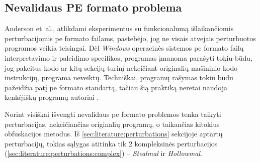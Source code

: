 \subsection{Nevalidaus PE formato problema}\label{sec:literature:pe_invalid}

Anderson et~al., atlikdami eksperimentus su funkcionalumą išlaikančiomis perturbacijomis \acs{pe} formato failams, pastebėjo, jog ne visais atvejais perturbuotos programos veikia teisingai. Dėl \textit{Windows} operacinės sistemos \acs{pe} formato failų interpretavimo ir paleidimo specifikos, programas įmanoma parašyti tokiu būdu, jog pakeitus kodo ar kitų sekcijų turinį nekeičiant originalių mašininio kodo instrukcijų, programa neveiktų. Techniškai, programų rašymas tokiu būdu pažeidžia patį \acs{pe} formato standartą, tačiau šią praktiką neretai naudoja kenkėjiškų programų autoriai \cite{andersonLearningEvadeStatic2018}.

Norint visiškai išvengti nevalidaus \acs{pe} formato problemos tenka taikyti perturbacijas, nekeičiančias originalių programų, o taikančias kitokius obfuskacijos metodus. Iš \ref{sec:literature:perturbations} sekcijoje aptartų perturbacijų, tokias sąlygas atitinka tik 2 kompleksinės perturbacijos (\ref{sec:literature:perturbations:complex}) -- \textit{Stealmal} ir \textit{Hollowmal}.